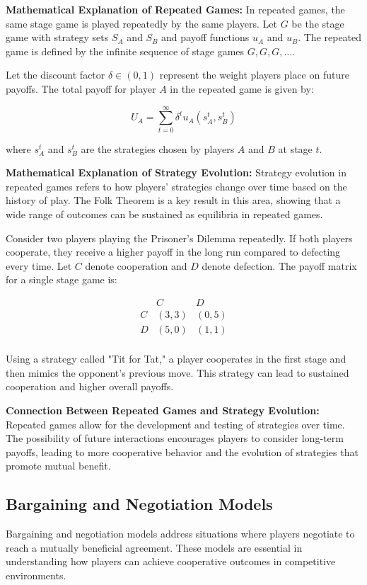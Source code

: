 \documentclass[12pt]{book} %
\begin{document}
\textbf{Mathematical Explanation of Repeated Games:}
In repeated games, the same stage game is played repeatedly by the same players. Let $G$ be the stage game with strategy sets $S_A$ and $S_B$ and payoff functions $u_A$ and $u_B$. The repeated game is defined by the infinite sequence of stage games $G, G, G, \ldots$.

Let the discount factor $\delta \in (0,1)$ represent the weight players place on future payoffs. The total payoff for player $A$ in the repeated game is given by:

\[
U_A = \sum_{t=0}^{\infty} \delta^t u_A(s_A^t, s_B^t)
\]

where $s_A^t$ and $s_B^t$ are the strategies chosen by players $A$ and $B$ at stage $t$.

\textbf{Mathematical Explanation of Strategy Evolution:}
Strategy evolution in repeated games refers to how players' strategies change over time based on the history of play. The Folk Theorem is a key result in this area, showing that a wide range of outcomes can be sustained as equilibria in repeated games.

Consider two players playing the Prisoner's Dilemma repeatedly. If both players cooperate, they receive a higher payoff in the long run compared to defecting every time. Let $C$ denote cooperation and $D$ denote defection. The payoff matrix for a single stage game is:

\[
\begin{array}{c|c|c}
& C & D \\
\hline
C & (3, 3) & (0, 5) \\
\hline
D & (5, 0) & (1, 1) \\
\end{array}
\]

Using a strategy called "Tit for Tat," a player cooperates in the first stage and then mimics the opponent's previous move. This strategy can lead to sustained cooperation and higher overall payoffs.

\textbf{Connection Between Repeated Games and Strategy Evolution:}
Repeated games allow for the development and testing of strategies over time. The possibility of future interactions encourages players to consider long-term payoffs, leading to more cooperative behavior and the evolution of strategies that promote mutual benefit.

\subsection{Bargaining and Negotiation Models}
Bargaining and negotiation models address situations where players negotiate to reach a mutually beneficial agreement. These models are essential in understanding how players can achieve cooperative outcomes in competitive environments.
\end{document}
